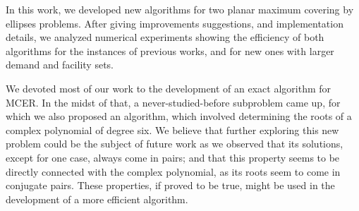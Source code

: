 In this work, we developed new algorithms for two planar maximum covering by ellipses problems.
After giving improvements suggestions, and implementation details, we analyzed numerical experiments showing the efficiency of both algorithms for the instances of previous works, and for new ones with larger demand and facility sets.

We devoted most of our work to the development of an exact algorithm for MCER.
In the midst of that, a never-studied-before subproblem came up, for which we also proposed an algorithm, which involved determining the roots of a complex polynomial of degree six.
We believe that further exploring this new problem could be the subject of future work as we observed that its solutions, except for one case, always come in pairs; and that this property seems to be directly connected with the complex polynomial, as its roots seem to come in conjugate pairs. These properties, if proved to be true, might be used in the development of a more efficient algorithm.